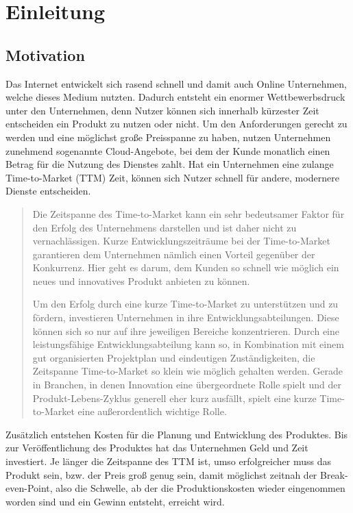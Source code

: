\chapter{Einleitung}
\label{chap:einleitung}

\section{Motivation}
\label{sec:motivation}
Das Internet entwickelt sich rasend schnell und damit auch Online Unternehmen, welche dieses Medium nutzten. Dadurch entsteht ein enormer Wettbewerbsdruck unter den Unternehmen, denn Nutzer können sich innerhalb kürzester Zeit entscheiden ein Produkt zu nutzen oder nicht. Um den Anforderungen gerecht zu werden und eine möglichst große Preisspanne zu haben, nutzen Unternehmen zunehmend sogenannte Cloud-Angebote, bei dem der Kunde monatlich einen Betrag für die Nutzung des Dienstes zahlt. Hat ein Unternehmen eine zulange Time-to-Market (TTM) Zeit, können sich Nutzer schnell für andere, modernere Dienste entscheiden. 

\begin{quotation}
\frqq Die Zeitspanne des Time-to-Market kann ein sehr bedeutsamer Faktor für den Erfolg des Unternehmens darstellen und ist daher nicht zu vernachlässigen. Kurze Entwicklungszeiträume bei der Time-to-Market garantieren dem Unternehmen nämlich einen Vorteil gegenüber der Konkurrenz. Hier geht es darum, dem Kunden so schnell wie möglich ein neues und innovatives Produkt anbieten zu können.
    
Um den Erfolg durch eine kurze Time-to-Market zu unterstützen und zu fördern, investieren Unternehmen in ihre Entwicklungsabteilungen. Diese können sich so nur auf ihre jeweiligen Bereiche konzentrieren. Durch eine leistungsfähige Entwicklungsabteilung kann so, in Kombination mit einem gut organisierten Projektplan und eindeutigen Zuständigkeiten, die Zeitspanne Time-to-Market so klein wie möglich gehalten werden. Gerade in Branchen, in denen Innovation eine übergeordnete Rolle spielt und der Produkt-Lebens-Zyklus generell eher kurz ausfällt, spielt eine kurze Time-to-Market eine außerordentlich wichtige Rolle.\flqq \cite{ttm}
\end{quotation}

Zusätzlich entstehen Kosten für die Planung und Entwicklung des Produktes. Bis zur Veröffentlichung des Produktes hat das Unternehmen Geld und Zeit investiert. Je länger die Zeitspanne des TTM ist, umso erfolgreicher muss das Produkt sein, bzw. der Preis groß genug sein, damit möglichst zeitnah der Break-even-Point, also die Schwelle, ab der die Produktionskosten wieder eingenommen worden sind und ein Gewinn entsteht, erreicht wird.

